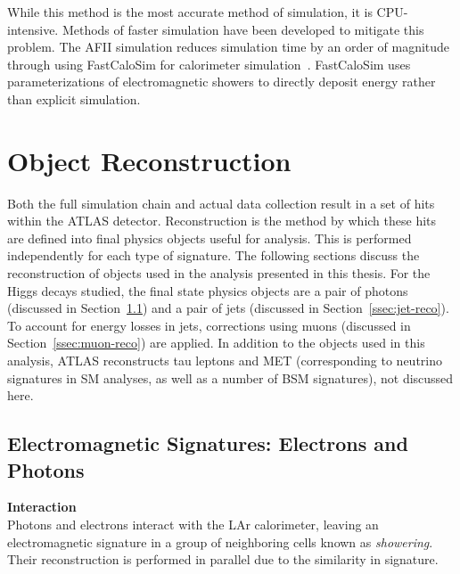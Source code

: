 While this method is the most accurate method of simulation, it is CPU-intensive. Methods of faster simulation have been developed to mitigate this problem. The \gls{AFII} simulation reduces simulation time by an order of magnitude through using FastCaloSim for calorimeter simulation~\cite{fastcalosim}. FastCaloSim uses parameterizations of electromagnetic showers to directly deposit energy rather than explicit simulation.


\section{Object Reconstruction}\label{sec:reconstruction}

Both the full simulation chain and actual data collection result in a set of hits within the ATLAS detector. Reconstruction is the method by which these hits are defined into final physics objects useful for analysis. This is performed independently for each type of signature. The following sections discuss the reconstruction of objects used in the analysis presented in this thesis. For the Higgs decays studied, the final state physics objects are a pair of photons (discussed in Section~\ref{ssec:em-signatures}) and a pair of jets (discussed in Section~\ref{ssec:jet-reco}). To account for energy losses in jets, corrections using muons (discussed in Section~\ref{ssec:muon-reco}) are applied. In addition to the objects used in this analysis, ATLAS reconstructs tau leptons and \gls{MET} (corresponding to neutrino signatures in \gls{SM} analyses, as well as a number of \gls{BSM} signatures), not discussed here.

\subsection{Electromagnetic Signatures: Electrons and Photons}\label{ssec:em-signatures} %

\noindent\textbf{Interaction}\\
\indent Photons and electrons interact with the \gls{LAr} calorimeter, leaving an electromagnetic signature in a group of neighboring cells known as \textit{showering}. Their reconstruction is performed in parallel due to the similarity in signature.

